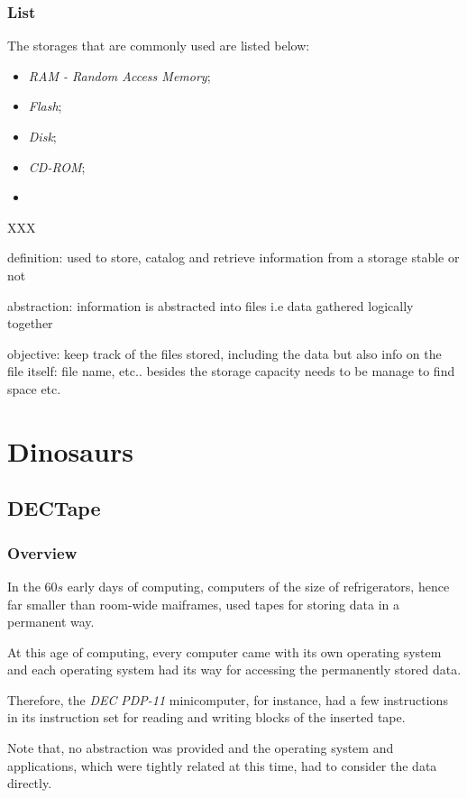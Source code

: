 
\begin{frame}
  \frametitle{List}

  The storages that are commonly used are listed below:

  \begin{itemize}
    \item
      \textit{RAM - Random Access Memory};
    \item
      \textit{Flash};
    \item
      \textit{Disk};
    \item
      \textit{CD-ROM};
    \item
      \etc{}
  \end{itemize}
\end{frame}

XXX

definition: used to store, catalog and retrieve information from a storage
  stable or not

abstraction: information is abstracted into files i.e data gathered logically
  together

objective: keep track of the files stored, including the data but also info
  on the file itself: file name, etc.. besides the storage capacity needs to
  be manage to find space etc.

%
%

\section{Dinosaurs}


\subsection{DECTape}


\begin{frame}
  \frametitle{Overview}

  In the $60s$ early days of computing, computers of the size of refrigerators,
  hence far smaller than room-wide maiframes, used tapes for storing
  data in a permanent way.

  \-

  At this age of computing, every computer came with its own operating system
  and each operating system had its way for accessing the permanently stored
  data.

  \-

  Therefore, the \textit{DEC} \textit{PDP-11} minicomputer, for instance,
  had a few instructions in its instruction set for reading and writing blocks
  of the inserted tape.

  \-

  Note that, no abstraction was provided and the operating system and
  applications, which were tightly related at this time, had to consider
  the data directly.
\end{frame}

